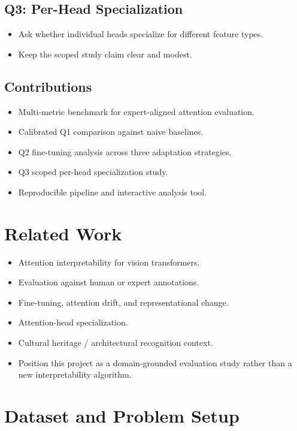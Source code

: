 \documentclass[11pt]{article}
\begin{document}
\subsection{Q3: Per-Head Specialization}

\begin{itemize}[leftmargin=1.5em]
    \item Ask whether individual heads specialize for different feature types.
    \item Keep the scoped study claim clear and modest.
\end{itemize}

\subsection{Contributions}

\begin{itemize}[leftmargin=1.5em]
    \item Multi-metric benchmark for expert-aligned attention evaluation.
    \item Calibrated Q1 comparison against naive baselines.
    \item Q2 fine-tuning analysis across three adaptation strategies.
    \item Q3 scoped per-head specialization study.
    \item Reproducible pipeline and interactive analysis tool.
\end{itemize}

\section{Related Work}

\begin{itemize}[leftmargin=1.5em]
    \item Attention interpretability for vision transformers.
    \item Evaluation against human or expert annotations.
    \item Fine-tuning, attention drift, and representational change.
    \item Attention-head specialization.
    \item Cultural heritage / architectural recognition context.
    \item Position this project as a domain-grounded evaluation study rather
    than a new interpretability algorithm.
\end{itemize}

\section{Dataset and Problem Setup}
\end{document}
